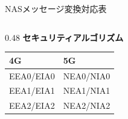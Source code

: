 \documentclass[dvipdfmx,11pt,aspectratio=169]{beamer}
\begin{document}
\begin{frame}{NASメッセージ変換対応表}
\begin{columns}[T]
\begin{column}{0.48\textwidth}
      \vspace{0.3cm}
      \textbf{セキュリティアルゴリズム}
      \begin{table}
        \tiny
        \begin{tabular}{|l|l|}
          \hline
          \textbf{4G} & \textbf{5G} \\
          \hline
          EEA0/EIA0 & NEA0/NIA0 \\
          EEA1/EIA1 & NEA1/NIA1 \\
          EEA2/EIA2 & NEA2/NIA2 \\
          \hline
        \end{tabular}
      \end{table}
    \end{column}
  \end{columns}
\end{frame}
\end{document}
